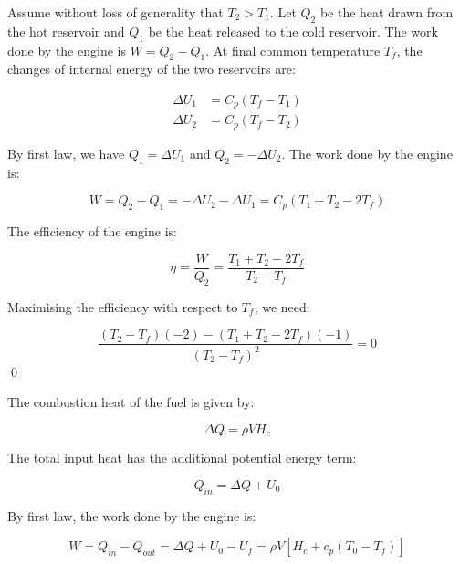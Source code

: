 \documentclass[12pt]{article}
\begin{document}
Assume without loss of generality that $T_{2} > T_{1}$. Let $Q_{2}$ be the heat drawn from the hot reservoir and $Q_{1}$ be the heat released to the cold reservoir. The work done by the engine is $W = Q_{2} - Q_{1}$. At final common temperature $T_{f}$, the changes of internal energy of the two reservoirs are:

\begin{equation}
\begin{split}
    \Delta U_{1} &= C_{p} (T_{f} - T_{1}) \\
    \Delta U_{2} &= C_{p} (T_{f} - T_{2})
\end{split}
\end{equation}

By first law, we have $Q_{1} = \Delta U_{1}$ and $Q_{2} = -\Delta U_{2}$. The work done by the engine is:

\begin{equation}
    W = Q_{2} - Q_{1} = -\Delta U_{2} - \Delta U_{1} = C_{p} (T_{1} + T_{2} - 2 T_{f})
\end{equation}

The efficiency of the engine is:

\begin{equation}
    \eta = \frac{W}{Q_{2}} = \frac{T_{1} + T_{2} - 2 T_{f}}{T_{2} - T_{f}}
\end{equation}

Maximising the efficiency with respect to $T_{f}$, we need:

\begin{equation}
    \frac{(T_{2} - T_{f})(-2) - (T_{1} + T_{2} - 2 T_{f})(-1)}{(T_{2} - T_{f})^{2}} = 0
\end{equation}
\qed


The combustion heat of the fuel is given by:

\begin{equation}
    \Delta Q = \rho V H_{c}
\end{equation}

The total input heat has the additional potential energy term:

\begin{equation}
    Q_{in} = \Delta Q + U_{0}
\end{equation}

By first law, the work done by the engine is:

\begin{equation}
    W = Q_{in} - Q_{out} = \Delta Q + U_{0} - U_{f} = \rho V [H_{c} + c_{p} (T_{0} - T_{f})]
\end{equation}
\end{document}
